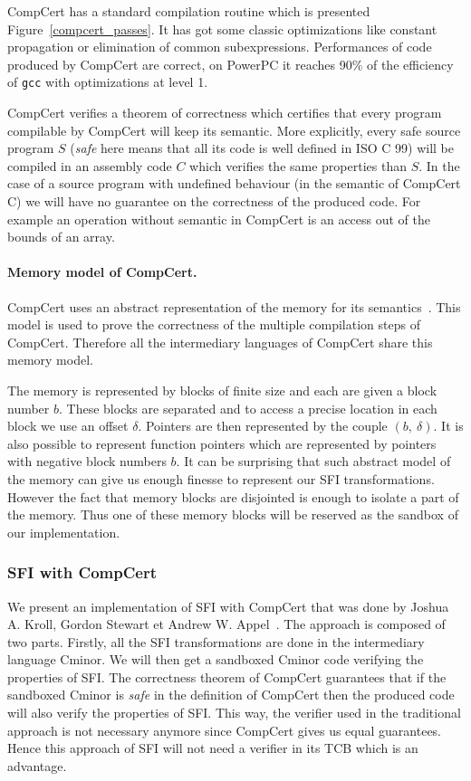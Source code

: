 \documentclass[11pt]{sdm}
\begin{document}
CompCert has a standard compilation routine which is presented Figure~\ref{compcert_passes}. It has got some classic optimizations like constant propagation or elimination of common subexpressions. Performances of code produced by CompCert are correct, on PowerPC it reaches 90\% of the efficiency of \texttt{gcc} with optimizations at level 1.

CompCert verifies a theorem of correctness which certifies that every program compilable by CompCert will keep its semantic. More explicitly, every safe source program $S$ (\textit{safe} here means that all its code is well defined in ISO C 99) will be compiled in an assembly code $C$ which verifies the same properties than $S$.
In the case of a source program with undefined behaviour (in the semantic of CompCert C) we will have no guarantee on the correctness of the produced code.
For example an operation without semantic in CompCert is an access out of the bounds of an array.

\paragraph{Memory model of CompCert.}
\label{par:Memory model of CompCert}
CompCert uses an abstract representation of the memory for its semantics~\cite{compCert_memory_model}. This model is used to prove the correctness of the multiple compilation steps of CompCert. Therefore all the intermediary languages of CompCert share this memory model.

The memory is represented by blocks of finite size and each are given a block number $b$. These blocks are separated and to access a precise location in each block we use an offset $\delta$. Pointers are then represented by the couple $(b,~\delta)$. It is also possible to represent function pointers which are represented by pointers with negative block numbers $b$. It can be surprising that such abstract model of the memory can give us enough finesse to represent our SFI transformations. However the fact that memory blocks are disjointed is enough to isolate a part of the memory. Thus one of these memory blocks will be reserved as the sandbox of our implementation.

\subsubsection{SFI with CompCert}
\label{ssub:SFI with CompCert}

We present an implementation of SFI with CompCert that was done by Joshua A. Kroll, Gordon Stewart et Andrew W. Appel~\cite{Kroll:2014:PSF:2708449.2708686}. The approach is composed of two parts. Firstly, all the SFI transformations are done in the intermediary language Cminor. We will then get a sandboxed Cminor code verifying the properties of SFI. The correctness theorem of CompCert guarantees that if the sandboxed Cminor is \textit{safe} in the definition of CompCert then the produced code will also verify the properties of SFI.
This way, the verifier used in the traditional approach is not necessary anymore since CompCert gives us equal guarantees. Hence this approach of SFI will not need a verifier in its TCB which is an advantage.
\end{document}
